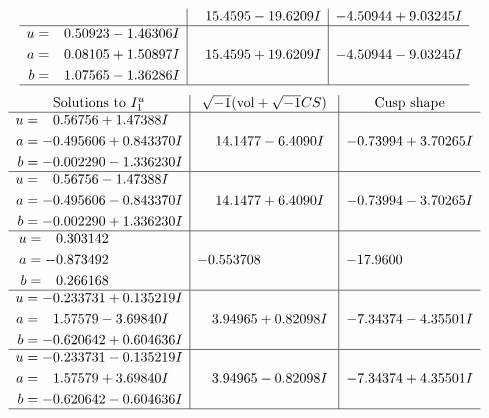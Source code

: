 \documentclass[1p]{elsarticle_modified}
\theoremstyle{definition}
\newcommand{\I}{\sqrt{-1}}
\begin{document}
$$\begin{array}{c|c|c}
 & \phantom{-}15.4595 - 19.6209 I & -4.50944 + 9.03245 I \\ \hline\begin{aligned}
u &= \phantom{-}0.50923 - 1.46306 I \\
a &= \phantom{-}0.08105 + 1.50897 I \\
b &= \phantom{-}1.07565 - 1.36286 I\end{aligned}
 & \phantom{-}15.4595 + 19.6209 I & -4.50944 - 9.03245 I\\
 \hline 
 \end{array}$$\newpage$$\begin{array}{c|c|c}  
\text{Solutions to }I^u_{1}& \I (\text{vol} + \sqrt{-1}CS) & \text{Cusp shape}\\
 \hline 
\begin{aligned}
u &= \phantom{-}0.56756 + 1.47388 I \\
a &= -0.495606 + 0.843370 I \\
b &= -0.002290 - 1.336230 I\end{aligned}
 & \phantom{-}14.1477 - 6.4090 I & -0.73994 + 3.70265 I \\ \hline\begin{aligned}
u &= \phantom{-}0.56756 - 1.47388 I \\
a &= -0.495606 - 0.843370 I \\
b &= -0.002290 + 1.336230 I\end{aligned}
 & \phantom{-}14.1477 + 6.4090 I & -0.73994 - 3.70265 I \\ \hline\begin{aligned}
u &= \phantom{-}0.303142\phantom{ +0.000000I} \\
a &= -0.873492\phantom{ +0.000000I} \\
b &= \phantom{-}0.266168\phantom{ +0.000000I}\end{aligned}
 & -0.553708\phantom{ +0.000000I} & -17.9600\phantom{ +0.000000I} \\ \hline\begin{aligned}
u &= -0.233731 + 0.135219 I \\
a &= \phantom{-}1.57579 - 3.69840 I \\
b &= -0.620642 + 0.604636 I\end{aligned}
 & \phantom{-}3.94965 + 0.82098 I & -7.34374 - 4.35501 I \\ \hline\begin{aligned}
u &= -0.233731 - 0.135219 I \\
a &= \phantom{-}1.57579 + 3.69840 I \\
b &= -0.620642 - 0.604636 I\end{aligned}
 & \phantom{-}3.94965 - 0.82098 I & -7.34374 + 4.35501 I\\
 \hline 
 \end{array}$$\newpage\newpage\renewcommand{\arraystretch}{1}
\end{document}
